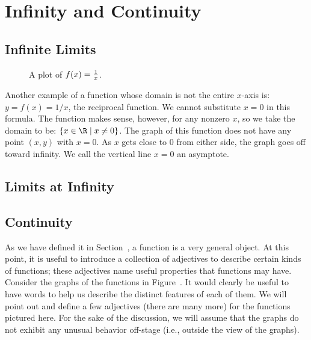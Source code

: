 \chapter{Infinity and Continuity}

\section{Infinite Limits}


\begin{figure}
\caption{A plot of $f(x)=\protect\frac{1}{x}$.}
\label{plot:1/x}
\end{figure}

Another example of a function whose domain is not the entire $x$-axis
is: $y=f(x)=1/x$, the reciprocal function.  We cannot substitute $x=0$
in this formula.  The function makes sense, however, for any nonzero
$x$, so we take the domain to be: $\{x\in\R\mid x\ne 0\}$.  The graph
of this function does not have any point $(x,y)$ with $x=0$.  As $x$
gets close to 0 from either side, the graph goes off toward infinity.
We call the vertical line $x=0$ an {\dfont
  asymptote}.

\section{Limits at Infinity}

\section{Continuity}

As we have defined it in Section~, a function is
a very general object.  At this point, it is useful to introduce a
collection of adjectives to describe certain kinds of functions; these
adjectives name useful properties that functions may have.  Consider
the graphs of the functions in Figure~.  It
would clearly be useful to have words to help us describe the distinct
features of each of them.  We will point out and define a few
adjectives (there are many more) for the functions pictured here.  For
the sake of the discussion, we will assume that the graphs do not
exhibit any unusual behavior off-stage (i.e., outside the view of the
graphs).


